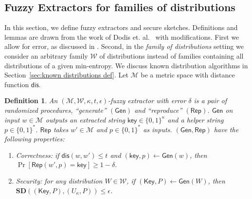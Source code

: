 \documentclass[11pt]{article}
\newcommand{\secref}[1]{\mbox{Section~\ref{#1}}}
\newcommand{\class}[1]{{\ensuremath{\mathsf{#1}}}}
\newcommand{\key}{\ensuremath{\class{key}}\xspace}
\newcommand{\Key}{\ensuremath{\class{Key}}\xspace}
\newcommand{\gen}{\ensuremath{\class{Gen}}\xspace}
\newcommand{\rep}{\ensuremath{\class{Rep}}\xspace}
\newcommand{\dis}{\ensuremath{\mathsf{dis}}}
\newcommand{\sd}{\ensuremath{\mathbf{SD}}}
\newtheorem{definition}[theorem]{Definition}
\begin{document}
\subsection{Fuzzy Extractors for families of distributions}\label{sec:fuzz extractor}

In this section, we define fuzzy extractors and secure sketches.  Definitions and lemmas are drawn from the work of Dodis et. al.~\cite[Sections 2.5--4.1]{DBLP:journals/siamcomp/DodisORS08} with modifications.  First we allow for error, as discussed in \cite[Section 8]{DBLP:journals/siamcomp/DodisORS08}.  Second, in the \emph{family of distributions} setting we consider an arbitrary family $\mathcal{W}$ of distributions instead of families containing all distributions of a given min-entropy.
We discuss known distribution algorithms in \secref{sec:known distributions def}.  Let $\mathcal{M}$ be a metric space with distance function $\dis$.

\begin{definition}
\label{def:fuzzy extractor}
An $(\mathcal{M}, \mathcal{W}, \kappa, t, \epsilon)$-\emph{fuzzy extractor} with error $\delta$ is a pair of randomized procedures, ``generate'' $(\gen)$ and ``reproduce'' $(\rep)$. \gen on input $w\in \mathcal{M}$ outputs an extracted string $\key \in\{0,1\}^\kappa$ and a helper string $p\in\{0,1\}^*$. \rep takes $w'\in\mathcal{M}$ and $p\in\{0,1\}^*$ as inputs.   $(\gen, \rep)$ have the following properties:
\begin{enumerate}
\item \emph{Correctness:} if $\dis(w, w')\leq t$ and $(\key, p)\leftarrow \gen(w)$, then $\Pr[\rep( w', p) = \key] \geq 1-\delta$.
\item \emph{Security:} for any distribution $W\in\mathcal{W}$, if $(\Key,P)\leftarrow\gen (W)$, then $\sd((\Key,P),(U_\kappa,P))\leq \epsilon$.
\end{enumerate}
\end{definition}
\end{document}

